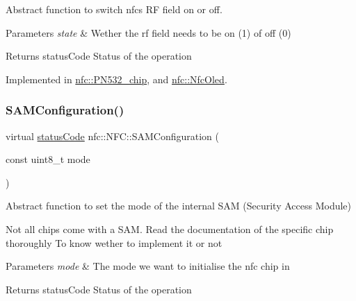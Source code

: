 Abstract function to switch nfc\textquotesingle{}s RF field on or off. 


\begin{DoxyParams}{Parameters}
{\em state} & Wether the rf field needs to be on (1) of off (0) \\
\hline
\end{DoxyParams}
\begin{DoxyReturn}{Returns}
status\+Code Status of the operation 
\end{DoxyReturn}


Implemented in \hyperlink{classnfc_1_1PN532__chip_a23d21f68ecf6ea7c8a134436b94943b9}{nfc\+::\+P\+N532\+\_\+chip}, and \hyperlink{classnfc_1_1NfcOled_a708a50eec4640caca921af9958c43972}{nfc\+::\+Nfc\+Oled}.

\mbox{\label{classnfc_1_1NFC_ab4dc91843bbd93211aa0f086e93b8608}} 
\subsubsection{\texorpdfstring{S\+A\+M\+Configuration()}{SAMConfiguration()}}
{\footnotesize\ttfamily virtual \hyperlink{declarations_8h_ae1d20c5a38cae82ccaa6a77be3fd264b}{status\+Code} nfc\+::\+N\+F\+C\+::\+S\+A\+M\+Configuration (\begin{DoxyParamCaption}\item[{const uint8\+\_\+t}]{mode }\end{DoxyParamCaption})\hspace{0.3cm}{\ttfamily [pure virtual]}}



Abstract function to set the mode of the internal S\+AM (Security Access Module) 

Not all chips come with a S\+AM. Read the documentation of the specific chip thoroughly To know wether to implement it or not


\begin{DoxyParams}{Parameters}
{\em mode} & The mode we want to initialise the nfc chip in \\
\hline
\end{DoxyParams}
\begin{DoxyReturn}{Returns}
status\+Code Status of the operation 
\end{DoxyReturn}


